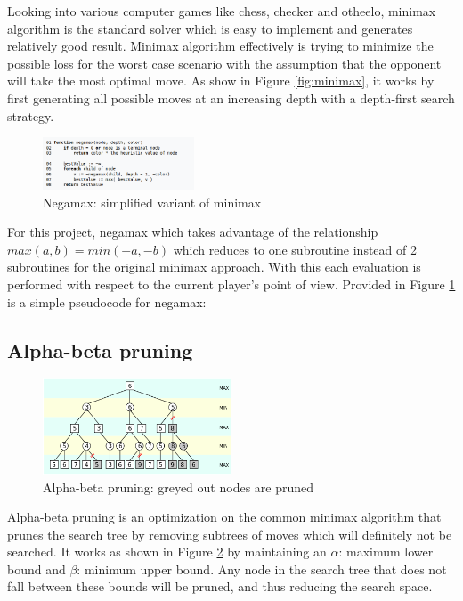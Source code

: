 \documentclass[12pt]{article}
\begin{document}
Looking into various computer games like chess, checker and otheelo, minimax
algorithm is the standard solver which is easy to implement and generates
relatively good result. Minimax algorithm effectively is trying to minimize the
possible loss for the worst case scenario with the assumption that the opponent
will take the most optimal move. As show in Figure \ref{fig:minimax}, it works by first
generating all possible moves at an increasing depth with a depth-first search
strategy.

\begin{figure}[H]
  \centering
  \includegraphics[width=0.4\textwidth, height=0.2\textwidth]{negamax.png}
  \caption{Negamax: simplified variant of minimax}
  \label{fig:negamax}
\end{figure}

For this project, negamax which takes advantage of the relationship $max(a,b) =
min(-a, -b)$ which reduces to one subroutine instead of 2 subroutines for the
original minimax approach. With this each evaluation is performed with respect
to the current player's point of view. Provided in Figure \ref{fig:negamax} is a simple pseudocode for negamax:

\subsection{Alpha-beta pruning}

\begin{figure}[H]
  \centering
  \includegraphics[width=0.5\textwidth, height=0.3\textwidth]{alphabetapruning.png}
  \caption{Alpha-beta pruning: greyed out nodes are pruned}
  \label{fig:alphabeta}
\end{figure}

Alpha-beta pruning is an optimization on the common minimax algorithm that
prunes the search tree by removing subtrees of moves which will definitely not
be searched. It works as shown in Figure \ref{fig:alphabeta} by maintaining an
$\alpha$: maximum lower bound and $\beta$: minimum upper bound. Any node in the
search tree that does not fall between these bounds will be pruned, and thus reducing the search space.  
\end{document}
